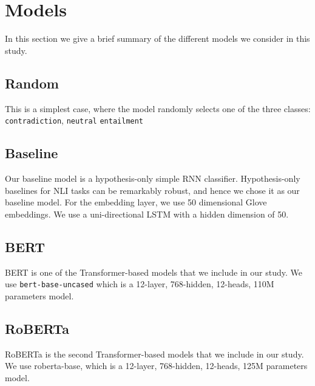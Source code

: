\section{Models}
\label{sec:models}


In this section we give a brief summary of the different models we consider in this study.

\subsection{Random}
\label{subsec:randommodel}

This is a simplest case, where the model randomly selects one of the three classes: {\texttt{contradiction}, \texttt{neutral} \texttt{entailment}}

\subsection{Baseline}
\label{subsec:baselinemodel}

Our baseline model is a hypothesis-only simple RNN classifier. Hypothesis-only baselines for NLI tasks can be remarkably robust, and hence we chose it as our baseline model. For the embedding layer, we use 50 dimensional Glove \cite{pennington2014glove} embeddings. We use a uni-directional LSTM with a hidden dimension of 50.

\subsection{BERT}
\label{subsec:bertmodel}

BERT \cite{devlin-etal-2019-bert} is one of the Transformer-based models that we include in our study. We use \texttt{bert-base-uncased} which is a 12-layer, 768-hidden, 12-heads, 110M parameters model.

\subsection{RoBERTa}
\label{subsec:robertamodel}

RoBERTa \cite{liu2019roberta} is the second Transformer-based models that we include in our study. We use roberta-base, which is a 12-layer, 768-hidden, 12-heads, 125M parameters model.